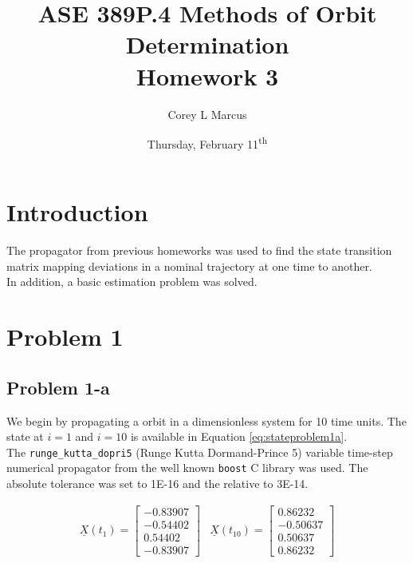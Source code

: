 \documentclass[11pt]{article}
\title{ASE 389P.4 Methods of Orbit Determination \\ Homework 3}
\author{Corey L Marcus} \date{Thursday, February 11\textsuperscript{th}}
\def\CC{{C\nolinebreak[4]\hspace{-.05em}\raisebox{.4ex}{\tiny\bf ++}}}
\begin{document}
\onehalfspace
\maketitle


\section{Introduction}

The propagator from previous homeworks was used to find the state transition matrix mapping deviations in a nominal trajectory at one time to another. \\

In addition, a basic estimation problem was solved.

\section{Problem 1}

\subsection{Problem 1-a}

We begin by propagating a orbit in a dimensionless system for 10 time units. The state at $i=1$ and $i=10$ is available in Equation \eqref{eq:stateproblem1a}. \\

The \texttt{runge\_kutta\_dopri5} (Runge Kutta Dormand-Prince 5) variable time-step numerical propagator from the well known \texttt{boost} {\CC} library was used. The absolute tolerance was set to 1E-16 and the relative to 3E-14.

\begin{equation}
	\label{eq:stateproblem1a}
	\begin{array}{lr}
		\underline{X}(t_1) = \begin{bmatrix}
			-0.83907 \\
			-0.54402 \\
			0.54402 \\
			-0.83907
		\end{bmatrix} & \underline{X}(t_{10}) = \begin{bmatrix}
			 0.86232 \\
			-0.50637 \\
			0.50637 \\
			0.86232
		\end{bmatrix}
	\end{array}
\end{equation}
\end{document}
